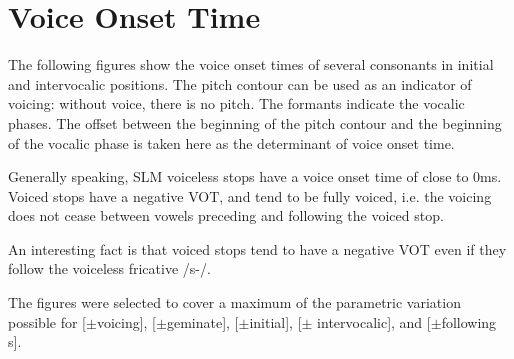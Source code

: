 \chapter{Voice Onset Time}\label{sec:VOT}

The following figures show the voice onset times of several consonants in initial and intervocalic positions. The pitch contour can be used as an indicator of voicing: without voice, there is no pitch. The formants indicate the vocalic phases. The offset between  the beginning of the pitch contour and the beginning of the vocalic phase is taken here as the determinant of voice onset time.

Generally speaking, SLM voiceless stops have a voice onset time of close to 0ms. Voiced stops have a negative VOT, and tend to be fully voiced, i.e. the voicing does not cease between vowels preceding and following the voiced stop.

An interesting fact is that voiced stops tend to have a negative VOT even if they follow the voiceless fricative /s-/.

The figures were selected to cover a maximum of the parametric variation possible for [$\pm$voicing], [$\pm$geminate], [$\pm$initial], [$\pm$ intervocalic], and [$\pm$following s].

